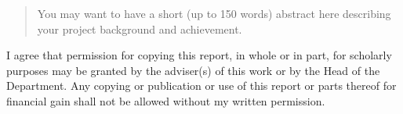 \begin{abstract}
    You may want to have a short (up to 150 words) abstract here describing your project background and achievement.
\end{abstract}

\vfill

\begin{permission}
    I agree that permission for copying this report, in whole or in part, for scholarly purposes may be granted by the adviser(s) of this work or by the Head of the Department. Any copying or publication or use of this report or parts thereof for financial gain shall not be allowed without my written permission.

\end{permission}



